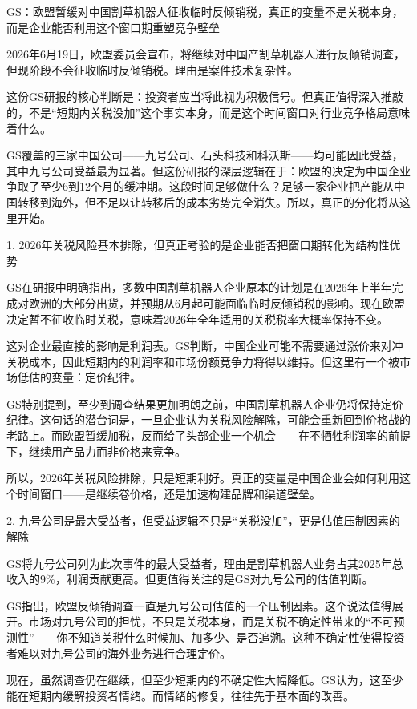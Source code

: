 \documentclass[11pt]{ctexart}
\begin{document}
GS：欧盟暂缓对中国割草机器人征收临时反倾销税，真正的变量不是关税本身，而是企业能否利用这个窗口期重塑竞争壁垒

2026年6月19日，欧盟委员会宣布，将继续对中国产割草机器人进行反倾销调查，但现阶段不会征收临时反倾销税。理由是案件技术复杂性。

这份GS研报的核心判断是：投资者应当将此视为积极信号。但真正值得深入推敲的，不是“短期内关税没加”这个事实本身，而是这个时间窗口对行业竞争格局意味着什么。

GS覆盖的三家中国公司——九号公司、石头科技和科沃斯——均可能因此受益，其中九号公司受益最为显著。但这份研报的深层逻辑在于：欧盟的决定为中国企业争取了至少6到12个月的缓冲期。这段时间足够做什么？足够一家企业把产能从中国转移到海外，但不足以让转移后的成本劣势完全消失。所以，真正的分化将从这里开始。

1. 2026年关税风险基本排除，但真正考验的是企业能否把窗口期转化为结构性优势

GS在研报中明确指出，多数中国割草机器人企业原本的计划是在2026年上半年完成对欧洲的大部分出货，并预期从6月起可能面临临时反倾销税的影响。现在欧盟决定暂不征收临时关税，意味着2026年全年适用的关税税率大概率保持不变。

这对企业最直接的影响是利润表。GS判断，中国企业可能不需要通过涨价来对冲关税成本，因此短期内的利润率和市场份额竞争力将得以维持。但这里有一个被市场低估的变量：定价纪律。

GS特别提到，至少到调查结果更加明朗之前，中国割草机器人企业仍将保持定价纪律。这句话的潜台词是，一旦企业认为关税风险解除，可能会重新回到价格战的老路上。而欧盟暂缓加税，反而给了头部企业一个机会——在不牺牲利润率的前提下，继续用产品力而非价格来竞争。

所以，2026年关税风险排除，只是短期利好。真正的变量是中国企业会如何利用这个时间窗口——是继续卷价格，还是加速构建品牌和渠道壁垒。

2. 九号公司是最大受益者，但受益逻辑不只是“关税没加”，更是估值压制因素的解除

GS将九号公司列为此次事件的最大受益者，理由是割草机器人业务占其2025年总收入的9\%，利润贡献更高。但更值得关注的是GS对九号公司的估值判断。

GS指出，欧盟反倾销调查一直是九号公司估值的一个压制因素。这个说法值得展开。市场对九号公司的担忧，不只是关税本身，而是关税不确定性带来的“不可预测性”——你不知道关税什么时候加、加多少、是否追溯。这种不确定性使得投资者难以对九号公司的海外业务进行合理定价。

现在，虽然调查仍在继续，但至少短期内的不确定性大幅降低。GS认为，这至少能在短期内缓解投资者情绪。而情绪的修复，往往先于基本面的改善。
\end{document}
